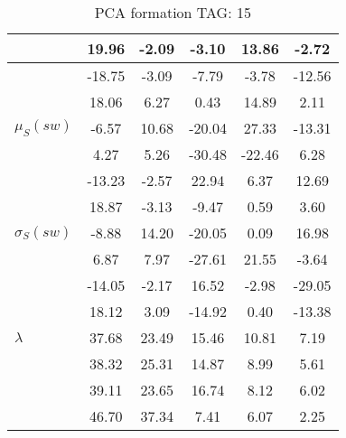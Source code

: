 \begin{table}[h!]
\begin{center}
\begin{tabular}{| l | c | c | c | c | c |}
 & 19.96  & -2.09  & -3.10  & 13.86  & -2.72 \\\hline
 & -18.75  & -3.09  & -7.79  & -3.78  & -12.56 \\\hline
 & 18.06  & 6.27  & 0.43  & 14.89  & 2.11 \\\hline
$\mu_S(sw)$ & -6.57  & 10.68  & -20.04  & 27.33  & -13.31 \\\hline
 & 4.27  & 5.26  & -30.48  & -22.46  & 6.28 \\\hline
 & -13.23  & -2.57  & 22.94  & 6.37  & 12.69 \\\hline
 & 18.87  & -3.13  & -9.47  & 0.59  & 3.60 \\\hline
$\sigma_S(sw)$ & -8.88  & 14.20  & -20.05  & 0.09  & 16.98 \\\hline
 & 6.87  & 7.97  & -27.61  & 21.55  & -3.64 \\\hline
 & -14.05  & -2.17  & 16.52  & -2.98  & -29.05 \\\hline
 & 18.12  & 3.09  & -14.92  & 0.40  & -13.38 \\\hline
$\lambda$ & 37.68  & 23.49  & 15.46  & 10.81  & 7.19 \\\hline
 & 38.32  & 25.31  & 14.87  & 8.99  & 5.61 \\\hline
 & 39.11  & 23.65  & 16.74  & 8.12  & 6.02 \\\hline
 & 46.70  & 37.34  & 7.41  & 6.07  & 2.25 \\\hline
\end{tabular}
\caption{PCA formation TAG: 15}
\end{center}
\end{table}